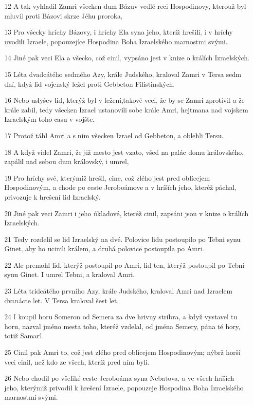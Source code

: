\par 12 A tak vyhladil Zamri všecken dum Bázuv vedlé reci Hospodinovy, kterouž byl mluvil proti Bázovi skrze Jéhu proroka,
\par 13 Pro všecky hríchy Bázovy, i hríchy Ela syna jeho, kteríž hrešili, i v hríchy uvodili Izraele, popouzejíce Hospodina Boha Izraelského marnostmi svými.
\par 14 Jiné pak veci Ela a všecko, což cinil, vypsáno jest v knize o králích Izraelských.
\par 15 Léta dvadcátého sedmého Azy, krále Judského, kraloval Zamri v Tersa sedm dní, když lid vojenský ležel proti Gebbeton Filistinských.
\par 16 Nebo uslyšev lid, kterýž byl v ležení,takové veci, že by se Zamri zprotivil a že krále zabil, tedy všecken Izrael ustanovili sobe krále Amri, hejtmana nad vojskem Izraelským toho casu v vojšte.
\par 17 Protož táhl Amri a s ním všecken Izrael od Gebbeton, a oblehli Tersu.
\par 18 A když videl Zamri, že již mesto jest vzato, všed na palác domu královského, zapálil nad sebou dum královský, i umrel,
\par 19 Pro hríchy své, kterýmiž hrešil, cine, což zlého jest pred oblícejem Hospodinovým, a chode po ceste Jeroboámove a v hríších jeho, kteréž páchal, privozuje k hrešení lid Izraelský.
\par 20 Jiné pak veci Zamri i jeho úkladové, kteréž cinil, zapsáni jsou v knize o králích Izraelských.
\par 21 Tedy rozdelil se lid Izraelský na dvé. Polovice lidu postoupilo po Tebni synu Ginet, aby ho ucinili králem, a druhá polovice postoupila po Amri.
\par 22 Ale premohl lid, kterýž postoupil po Amri, lid ten, kterýž postoupil po Tebni synu Ginet. I umrel Tebni, a kraloval Amri.
\par 23 Léta tridcátého prvního Azy, krále Judského, kraloval Amri nad Izraelem dvanácte let. V Tersa kraloval šest let.
\par 24 I koupil horu Someron od Semera za dve hrivny stríbra, a když vystavel tu horu, nazval jméno mesta toho, kteréž vzdelal, od jména Semery, pána té hory, totiž Samarí.
\par 25 Cinil pak Amri to, což jest zlého pred oblícejem Hospodinovým; nýbrž horší veci cinil, než kdo ze všech, kteríž pred ním byli.
\par 26 Nebo chodil po všeliké ceste Jeroboáma syna Nebatova, a ve všech hríších jeho, kterýmiž privodil k hrešení Izraele, popouzeje Hospodina Boha Izraelského marnostmi svými.
